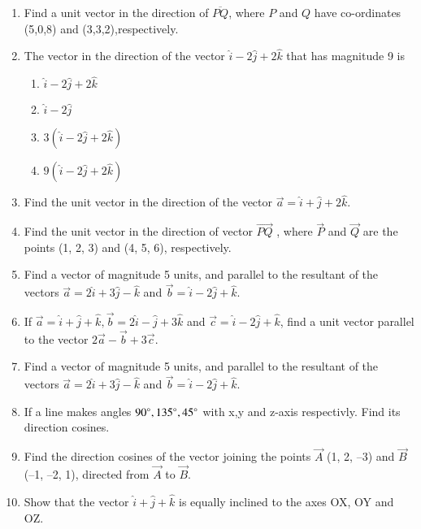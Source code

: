\begin{enumerate}[label=\thesubsection.\arabic*,ref=\thesubsection.\theenumi]
\item Find a unit vector in the direction of $\overline{PQ} $, where $P$ and $Q$ have co-ordinates (5,0,8) and (3,3,2),respectively.
\item The vector in the direction of the vector $\hat{i}-2\hat{j}+2\hat{k}$ that has magnitude 9 is
	\begin{enumerate}
\item $\hat{i}-2\hat{j}+2\hat{k}$
\item $\hat{i}-2\hat{j}$
\item $3(\hat{i}-2\hat{j}+2\hat{k})$
\item $9(\hat{i}-2\hat{j}+2\hat{k})$
\end{enumerate}
\item Find the unit vector in the direction of the vector $\vec{a}=\hat{i}+\hat{j}+2\hat{k}$.
\item Find the unit vector in the direction of vector $\overrightarrow{PQ}$ , where $\vec{P}$ and $\vec{Q}$ are the points
(1, 2, 3) and (4, 5, 6), respectively.
\item Find a vector of magnitude 5 units, and parallel to the resultant of the vectors $\vec{a}=2\hat{i}+3\hat{j}-\hat{k}$ and $\vec{b}=\hat{i}-2\hat{j}+\hat{k}$.\\
\item If $\vec{a}=\hat{i}+\hat{j}+\hat{k}, \vec{b}=2\hat{i}-\hat{j}+3\hat{k}$ and $\vec{c}=\hat{i}-2\hat{j}+\hat{k}$, find a unit vector parallel to the vector $2\vec{a}-\vec{b}+3\vec{c}$.\\
	\solution
		
	\item 
Find a vector of magnitude 5 units, and parallel to the resultant of the vectors $\vec{a} = 2\hat{i}+3\hat{j}-\hat{k}$ and $\vec{b} = \hat{i}-2\hat{j}+\hat{k}$.
\\
\solution
		
	\item If a line makes angles $90\degree,135\degree,45\degree$ with x,y and z-axis respectivly. Find its direction cosines.
		\\
		\solution
		
\item Find the direction cosines of the vector joining the points $\vec{A}$ (1, 2, –3) and
$\vec{B}$(–1, –2, 1), directed from $\vec{A}$ to $\vec{B}$.
	\\
    \solution 
		
\item Show that the vector $\hat{i}+\hat{j}+\hat{k}$ is equally inclined to the axes OX, OY and OZ.

\end{enumerate}

